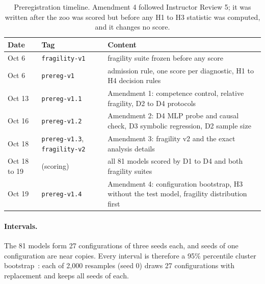 \documentclass[11pt]{scrartcl}
\begin{document}
\begin{table}[H]
    \centering
    \small
    \begin{tabular}{>{\raggedright\arraybackslash}p{1.5cm}>{\raggedright\arraybackslash}p{3.1cm}>{\raggedright\arraybackslash}p{9.6cm}}
    \toprule
    Date & Tag & Content \\
    \midrule
    Oct 6 & \texttt{fragility-v1} & fragility suite frozen before any score \\
    Oct 6 & \texttt{prereg-v1} & admission rule, one score per diagnostic, H1 to H4 decision rules \\
    Oct 13 & \texttt{prereg-v1.1} & Amendment 1: competence control, relative fragility, D2 to D4 protocols \\
    Oct 16 & \texttt{prereg-v1.2} & Amendment 2: D4 MLP probe and causal check, D3 symbolic regression, D2 sample size \\
    Oct 18 & \texttt{prereg-v1.3}, \texttt{fragility-v2} & Amendment 3: fragility v2 and the exact analysis details \\
    Oct 18 to 19 & (scoring) & all 81 models scored by D1 to D4 and both fragility suites \\
    Oct 19 & \texttt{prereg-v1.4} & Amendment 4: configuration bootstrap, H3 without the test model, fragility distribution first \\
    \bottomrule
    \end{tabular}
    \caption{Preregistration timeline. Amendment 4 followed Instructor Review 5; it was written after the zoo
    was scored but before any H1 to H3 statistic was computed, and it changes no score.}
    \label{tab:prereg}
\end{table}

\paragraph{Intervals.} The 81 models form 27 configurations of three seeds each, and seeds of one
configuration are near copies. Every interval is therefore a 95\% percentile cluster
bootstrap~\cite{cameron2008bootstrap}: each of 2,000 resamples (seed 0) draws 27 configurations with
replacement and keeps all seeds of each.
\end{document}
